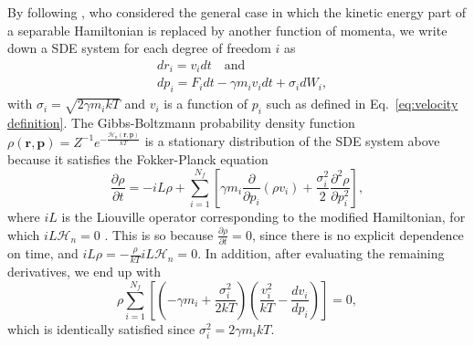 \documentclass[
aip,
jcp,
reprint,
]{revtex4-1}
\newcommand{\vt}[1]{\boldsymbol{\mathbf{#1}}}          %
\newcommand{\diff}[2]{\frac{\partial #2}{\partial #1}} %
\begin{document}
By following \citeauthor{Stoltz_2018} \cite{Stoltz_2018}, who considered the general case in which the kinetic energy part of a separable Hamiltonian is replaced by another function of momenta, we write down a SDE system for each degree of freedom $i$ as
\begin{subequations}
	\label{eq:Langevin equations}
	\begin{align}
	&dr_i = v_i dt \quad \mathrm{and} \\
	&dp_i = F_i dt - \gamma m_i v_i dt + \sigma_i dW_i,
	\end{align}
\end{subequations}
with $\sigma_i = \sqrt{2 \gamma m_i kT}$ and $v_i$ is a function of $p_i$ such as defined in Eq.~\eqref{eq:velocity definition}.
The Gibbs-Boltzmann probability density function $\rho(\vt r, \vt p) = {Z}^{-1} e^{-\frac{\mathcal{H}_n(\vt r, \vt p)}{kT}}$ is a stationary distribution of the SDE system above because it satisfies the Fokker-Planck equation \cite{Leimkuhler_2015}
\begin{equation}
\diff{t}{\rho} = -i\!L \rho + \sum_{i=1}^{N_f} \left[ \gamma m_i \diff{p_i}{}(\rho v_i) + \frac{\sigma_i^2}{2} \diff{p_i^2}{^2 \rho} \right],
\end{equation}
where $i\!L$ is the Liouville operator corresponding to the modified Hamiltonian, for which $i\!L \mathcal{H}_n = 0$ \cite{Tuckerman_2010}.
This is so because $\diff{t}{\rho} = 0$, since there is no explicit dependence on time, and $i\!L \rho = -\frac{\rho}{kT}i\!L \mathcal{H}_n = 0$.
In addition, after evaluating the remaining derivatives, we end up with
\begin{equation}
\rho \sum_{i=1}^{N_f} \left[ \left(-\gamma m_i + \frac{\sigma_i^2}{2 kT}\right) \left(\frac{v_i^2}{kT} - \frac{d v_i}{d p_i}\right) \right] = 0,
\end{equation}
which is identically satisfied since $\sigma_i^2 = 2 \gamma m_i kT$.
\end{document}
